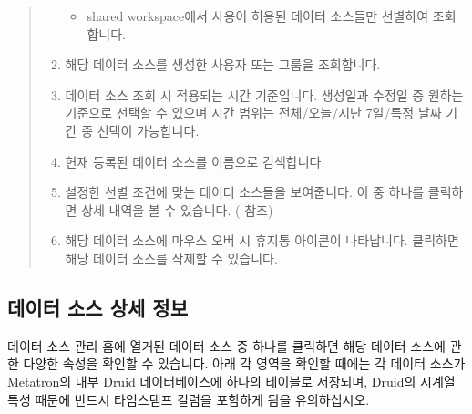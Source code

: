 \documentclass[letterpaper,10pt,english]{sphinxmanual}
\begin{document}
\begin{quote}
\begin{enumerate}
\begin{itemize}
\item {} 
 shared workspace에서 사용이 허용된 데이터 소스들만 선별하여 조회합니다.

\end{itemize}

\item {} 
 해당 데이터 소스를 생성한 사용자 또는 그룹을 조회합니다.

\item {} 
 데이터 소스 조회 시 적용되는 시간 기준입니다. 생성일과 수정일 중 원하는 기준으로 선택할 수 있으며 시간 범위는 전체/오늘/지난 7일/특정 날짜 기간 중 선택이 가능합니다.

\item {} 
 현재 등록된 데이터 소스를 이름으로 검색합니다

\item {} 
 설정한 선별 조건에 맞는 데이터 소스들을 보여줍니다. 이 중 하나를 클릭하면 상세 내역을 볼 수 있습니다. ({\hyperref[\detokenize{discovery/part02/data_source_detail_view::doc}]{}} 참조)

\item {} 
 해당 데이터 소스에 마우스 오버 시 휴지통 아이콘이 나타납니다. 클릭하면 해당 데이터 소스를 삭제할 수 있습니다.

\end{enumerate}
\end{quote}


\subsection{데이터 소스 상세 정보}
\label{\detokenize{discovery/part02/data_source_detail_view:id1}}\label{\detokenize{discovery/part02/data_source_detail_view::doc}}
데이터 소스 관리 홈에 열거된 데이터 소스 중 하나를 클릭하면 해당 데이터 소스에 관한 다양한 속성을 확인할 수 있습니다. 아래 각 영역을 확인할 때에는 각 데이터 소스가 Metatron의 내부 Druid 데이터베이스에 하나의 테이블로 저장되며, Druid의 시계열 특성 때문에 반드시 타임스탬프 컬럼을 포함하게 됨을 유의하십시오.
\begin{quote}

\begin{figure}[H]
\centering

\noindent{}
\end{figure}
\end{quote}
\end{document}
